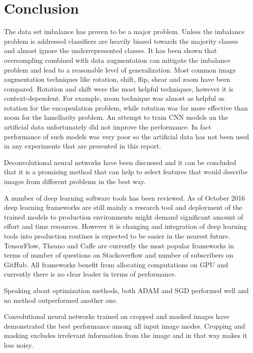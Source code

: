 \documentclass[a4paper, 11pt, table]{article}
\begin{document}
\section{Conclusion}

The data set imbalance has proven to be a major problem. Unless the imbalance problem is addressed classifiers are heavily biased towards the majority classes and almost ignore the underrepresented classes. It has been shown that oversampling combined with data augmentation can mitigate the imbalance problem and lead to a reasonable level of generalization. Most common image augmentation techniques like rotation, shift, flip, shear and zoom have been compared. Rotation and shift were the most helpful techniques, however it is context-dependent. For example, zoom technique was almost as helpful as rotation for the encapsulation problem, while rotation was far more effective than zoom for the lamellarity problem. An attempt to train CNN models an the artificial data unfortunately did not improve the performance. In fact performance of such models was very poor so the artificial data has not been used in any experiments that are presented in this report. 

Deconvolutional neural networks have been discussed and it can be concluded that it is a promising method that can help to select features that would describe images from different problems in the best way.  

A number of deep learning software tools has been reviewed. As of October 2016 deep learning frameworks are still mainly a research tool and deployment of the trained models to production environments might demand significant amount of effort and time resources. However it is changing and integration of deep learning tools into production routines is expected to be easier in the nearest future. TensorFlow, Theano and Caffe are currently the most popular frameworks in terms of number of questions on Stackoverflow and number of subscribers on GitHub. All frameworks benefit from allocating computations on GPU and currently there is no clear leader in terms of performance. 

Speaking about optimization methods, both ADAM and SGD performed well and no method outperformed another one.

Convolutional neural networks trained on cropped and masked images have demonstrated the best performance among all input image modes. Cropping and masking excludes irrelevant information from the image and in that way makes it less noisy. 
\end{document}
